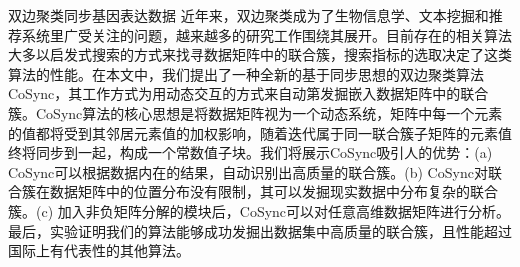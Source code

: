 
\begin{Cabstract}{双边聚类}{同步}{基因表达数据}{}{}
近年来，双边聚类成为了生物信息学、文本挖掘和推荐系统里广受关注的问题，越来越多的研究工作围绕其展开。目前存在的相关算法大多以启发式搜索的方式来找寻数据矩阵中的联合簇，搜索指标的选取决定了这类算法的性能。在本文中，我们提出了一种全新的基于同步思想的双边聚类算法CoSync，其工作方式为用动态交互的方式来自动第发掘嵌入数据矩阵中的联合簇。CoSync算法的核心思想是将数据矩阵视为一个动态系统，矩阵中每一个元素的值都将受到其邻居元素值的加权影响，随着迭代属于同一联合簇子矩阵的元素值终将同步到一起，构成一个常数值子块。我们将展示CoSync吸引人的优势：(a) CoSync可以根据数据内在的结果，自动识别出高质量的联合簇。(b) CoSync对联合簇在数据矩阵中的位置分布没有限制，其可以发掘现实数据中分布复杂的联合簇。(c) 加入非负矩阵分解的模块后，CoSync可以对任意高维数据矩阵进行分析。最后，实验证明我们的算法能够成功发掘出数据集中高质量的联合簇，且性能超过国际上有代表性的其他算法。
\end{Cabstract}

